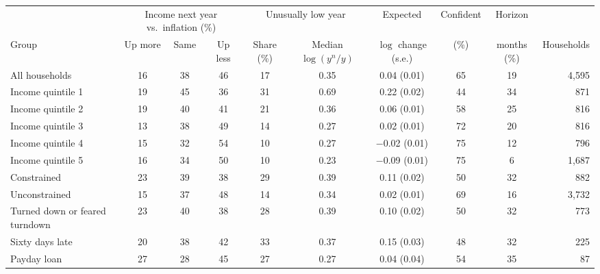 \begin{tabular}{lcccccccc r}
\toprule
 & \multicolumn{3}{c}{Income next year vs.\ inflation (\%)} & \multicolumn{2}{c}{Unusually low year} & Expected & Confident & Horizon & \\
\cmidrule(lr){2-4} \cmidrule(lr){5-6}
Group & Up more & Same & Up less & Share (\%) & Median $\log(y^{n}/y)$ & $\log$ change (s.e.) & (\%) & months (\%) & Households \\
\midrule
All households & 16 & 38 & 46 & 17 & 0.35 & 0.04 (0.01) & 65 & 19 & 4,595 \\
\addlinespace
Income quintile 1 & 19 & 45 & 36 & 31 & 0.69 & 0.22 (0.02) & 44 & 34 & 871 \\
Income quintile 2 & 19 & 40 & 41 & 21 & 0.36 & 0.06 (0.01) & 58 & 25 & 816 \\
Income quintile 3 & 13 & 38 & 49 & 14 & 0.27 & 0.02 (0.01) & 72 & 20 & 816 \\
Income quintile 4 & 15 & 32 & 54 & 10 & 0.27 & $-$0.02 (0.01) & 75 & 12 & 796 \\
Income quintile 5 & 16 & 34 & 50 & 10 & 0.23 & $-$0.09 (0.01) & 75 & 6 & 1,687 \\
\addlinespace
Constrained & 23 & 39 & 38 & 29 & 0.39 & 0.11 (0.02) & 50 & 32 & 882 \\
Unconstrained & 15 & 37 & 48 & 14 & 0.34 & 0.02 (0.01) & 69 & 16 & 3,732 \\
\addlinespace
Turned down or feared turndown & 23 & 40 & 38 & 28 & 0.39 & 0.10 (0.02) & 50 & 32 & 773 \\
Sixty days late & 20 & 38 & 42 & 33 & 0.37 & 0.15 (0.03) & 48 & 32 & 225 \\
Payday loan & 27 & 28 & 45 & 27 & 0.27 & 0.04 (0.04) & 54 & 35 & 87 \\
\bottomrule
\end{tabular}
